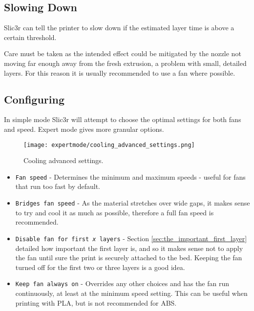 
\subsection{Slowing Down} %
\label{sub:slowing_down}
Slic3r can tell the printer to slow down if the estimated layer time is above a certain threshold.

Care must be taken as the intended effect could be mitigated by the nozzle not moving far enough away from the fresh extrusion, a problem with small, detailed layers.  For this reason it is usually recommended to use a fan where possible.

\subsection{Configuring} %
\label{sub:configuring_cooling}

In simple mode Slic3r will attempt to choose the optimal settings for both fans and speed.  Expert mode gives more granular options.

\begin{figure}[H]
\centering
\texttt{[image: expertmode/cooling\_advanced\_settings.png]}
\caption{Cooling advanced settings.}
\label{fig:cooling_advanced_settings}
\end{figure}

\begin{itemize}
	\item \texttt{Fan speed}  - Determines the minimum and maximum speeds - useful for fans that run too fast by default.
	\item \texttt{Bridges fan speed}  - As the material stretches over wide gaps, it makes sense to try and cool it as much as possible, therefore a full fan speed is recommended.
	\item \texttt{Disable fan for first \textit{x} layers}  - Section \ref{sec:the_important_first_layer} detailed how important the first layer is, and so it makes sense not to apply the fan until sure the print is securely attached to the bed.  Keeping the fan turned off for the first two or three layers is a good idea.
	\item \texttt{Keep fan always on}  - Overrides any other choices and has the fan run continuously, at least at the minimum speed setting.  This can be useful when printing with PLA, but is not recommended for ABS.
\end{itemize}

